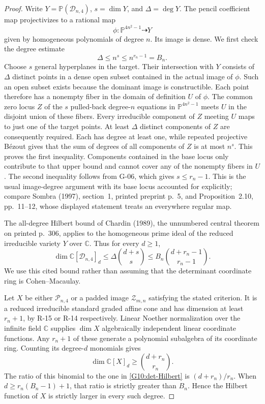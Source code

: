 \begin{proof}
Write $Y=\mathbb P(\mathcal D_{n,4})$, $s=\dim Y$, and
$\Delta=\deg Y$. The pencil coefficient map projectivizes to a
rational map
\[
 \phi:\mathbb P^{4n^2-1}\dashrightarrow Y
\]
given by homogeneous polynomials of degree $n$. Its image is dense.
We first check the degree estimate
\begin{equation}\label{G10:image-degree}
 \Delta\leq n^s\leq n^{r_n-1}=B_n.
\end{equation}
Choose $s$ general hyperplanes in the target. Their intersection
with $Y$ consists of $\Delta$ distinct points in a dense open subset
contained in the actual image of $\phi$. Such an open subset exists
because the dominant image is constructible. Each point therefore
has a nonempty fiber in the domain of definition $U$ of $\phi$.
The common zero locus $Z$ of the $s$ pulled-back degree-$n$
equations in $\mathbb P^{4n^2-1}$ meets $U$ in the disjoint union
of these fibers. Every irreducible component of $Z$ meeting $U$
maps to just one of the target points. At least $\Delta$ distinct
components of $Z$ are consequently required. Each has degree at
least one, while repeated projective B\'ezout gives that the sum
of degrees of all components of $Z$ is at most $n^s$.
This proves the first inequality. Components contained in the
base locus only contribute to that upper bound and cannot cover
any of the nonempty fibers in $U$.
The second inequality follows from G-06, which gives $s\leq r_n-1$.
This is the usual image-degree argument with its base locus
accounted for explicitly; compare Sombra (1997), section~1,
printed preprint p.~5, and Proposition~2.10, pp.~11--12,
whose displayed statement treats an everywhere regular map.

The all-degree Hilbert bound of Chardin (1989), the unnumbered
central theorem on printed p.~306, applies to the homogeneous
prime ideal of the reduced irreducible variety $Y$ over
$\mathbb C$. Thus for every $d\geq1$,
\begin{equation}\label{G10:det-Hilbert}
 \dim\mathbb C[\mathcal D_{n,4}]_d
 \leq\Delta\binom{d+s}{s}
 \leq B_n\binom{d+r_n-1}{r_n-1}.
\end{equation}
We use this cited bound rather than assuming that the determinant
coordinate ring is Cohen--Macaulay.

Let $X$ be either $\mathcal P_{n,4}$ or a padded image
$\mathcal Z_{m,n}$ satisfying the stated criterion. It is a
reduced irreducible standard graded affine cone and has dimension
at least $r_n+1$, by R-15 or R-14 respectively. Linear Noether
normalization over the infinite field $\mathbb C$ supplies
$\dim X$ algebraically independent linear coordinate functions.
Any $r_n+1$ of these generate a polynomial subalgebra of its
coordinate ring. Counting its degree-$d$ monomials gives
\begin{equation}\label{G10:per-Hilbert}
 \dim\mathbb C[X]_d\geq\binom{d+r_n}{r_n}.
\end{equation}
The ratio of this binomial to the one in
\eqref{G10:det-Hilbert} is $(d+r_n)/r_n$.
When $d\geq r_n(B_n-1)+1$, that ratio is strictly greater
than $B_n$. Hence the Hilbert function of $X$ is strictly larger
in every such degree.


\end{proof}
